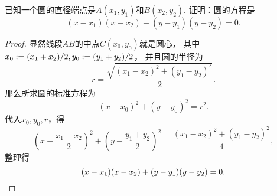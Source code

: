 \begin{example}
已知一个圆的直径端点是\(A(x_1,y_1)\)和\(B(x_2,y_2)\).
证明：圆的方程是\begin{equation*}
	(x-x_1)(x-x_2) + (y-y_1)(y-y_2) = 0.
\end{equation*}
\begin{proof}
显然线段\(AB\)的中点\(C(x_0,y_0)\)就是圆心，
其中\(
	x_0 := (x_1+x_2)/2,
	y_0 := (y_1+y_2)/2
\)，
并且圆的半径为\begin{equation*}
	r = \frac{\sqrt{(x_1-x_2)^2+(y_1-y_2)^2}}{2}.
\end{equation*}
那么所求圆的标准方程为\begin{equation*}
	(x-x_0)^2 + (y-y_0)^2 = r^2.
\end{equation*}
代入\(x_0,y_0,r\)，得\begin{equation*}
	\left( x - \frac{x_1+x_2}{2} \right)^2
	+ \left( y - \frac{y_1+y_2}{2} \right)^2
	= \frac{(x_1-x_2)^2+(y_1-y_2)^2}{4},
\end{equation*}
整理得\begin{equation*}
	(x-x_1)(x-x_2) + (y-y_1)(y-y_2) = 0.
	\qedhere
\end{equation*}
\end{proof}
\end{example}

